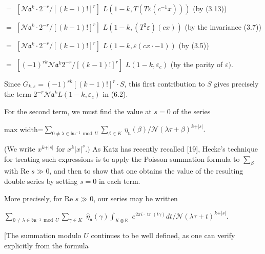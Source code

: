 \documentclass[11pt]{article}
\newcommand{\DFormula}[1]{\par\smallskip\noindent\begin{adjustbox}{max width=\linewidth}$\displaystyle #1$\end{adjustbox}\par\smallskip}
\begin{document}
\par
\(=\) \([\mathcal{N}𝔞^{k}\cdot 2^{-r}/[(k-1)!]^{r}]\) \(L(1-k,T(T\varepsilon (c^{-1}x)))\)          (by (3.13))\par
\par
\(=\) \([\mathcal{N}𝔞^{k}\cdot 2^{-r}/[(k-1)!]^{r}]\) \(L(1-k,(T^{2}\varepsilon )(cx))\)              (by the invariance (3.7))\par
\par
\(=\) \([\mathcal{N}𝔞^{k}\cdot 2^{-r}/[(k-1)!]^{r}]\) \(L(1-k,\varepsilon (cx\cdot -1))\)               (by (3.5))\par
\par
\(=\) \([(-1)^{rk}\mathcal{N}𝔞^{k}2^{-r}/[(k-1)!]^{r}]\) \(L(1-k,\varepsilon _{c})\)            (by the parity of \(\varepsilon )\).\par
\par
Since \(G_{k,\varepsilon }=(-1)^{rk}[(k-1)!]^{r}\cdot S\), this first contribution to \(S\) gives precisely the term \(2^{-r}\mathcal{N}𝔞^{k}L(1-k,\varepsilon _{c})\) in (6.2).\par
\par
For the second term, we must find the value at \(s=0\) of the series\par
\par
\DFormula{\sum _{0\neq \lambda \in 𝔟𝔲^{-1}\,\operatorname{mod}\,U}\sum _{\beta \in K}\,\eta _{𝔲}(\beta )/\mathcal{N}(\lambda \tau +\beta )^{k+\vert s\vert }.}
\par
(We write \(x^{k+\vert s\vert }\) for \(x^{k}\vert x\vert ^{s}.)\) As Katz has recently recalled [19], Hecke’s technique for treating such expressions is to apply the Poisson summation formula to \(\sum _{\beta }\) with Re \(s\gg 0\), and then to show that one obtains the value of the resulting double series by setting \(s=0\) in each term.\par
\par
More precisely, for Re \(s\gg 0\), our series may be written\par
\par
\(\sum _{0\neq \lambda \in 𝔟𝔲^{-1}\,\operatorname{mod}\,U}\sum _{\gamma \in K}\) \(\widehat{\eta }_{𝔲}(\gamma )\int _{K\otimes \mathbb{R}}\) \(e^{2\pi i\cdot \operatorname{tr}(t\gamma )}dt/\mathcal{N}(\lambda \tau +t)^{k+\vert s\vert }\).\par
\par
[The summation modulo \(U\) continues to be well defined, as one can verify explicitly from the formula\par
\par
\end{document}
